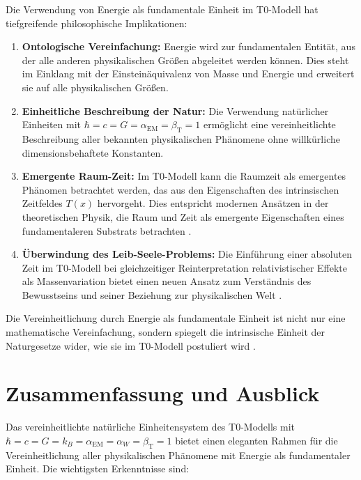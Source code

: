 \documentclass[12pt,a4paper]{article}
\newcommand{\Tfield}{T(x)}
\newcommand{\alphaEM}{\alpha_{\text{EM}}}
\newcommand{\betaT}{\beta_{\text{T}}}
\begin{document}
Die Verwendung von Energie als fundamentale Einheit im T0-Modell hat tiefgreifende philosophische Implikationen:

\begin{enumerate}
	\item \textbf{Ontologische Vereinfachung:} Energie wird zur fundamentalen Entität, aus der alle anderen physikalischen Größen abgeleitet werden können. Dies steht im Einklang mit der Einsteinäquivalenz von Masse und Energie und erweitert sie auf alle physikalischen Größen.
	
	\item \textbf{Einheitliche Beschreibung der Natur:} Die Verwendung natürlicher Einheiten mit $\hbar = c = G = \alphaEM = \betaT = 1$ ermöglicht eine vereinheitlichte Beschreibung aller bekannten physikalischen Phänomene ohne willkürliche dimensionsbehaftete Konstanten.
	
	\item \textbf{Emergente Raum-Zeit:} Im T0-Modell kann die Raumzeit als emergentes Phänomen betrachtet werden, das aus den Eigenschaften des intrinsischen Zeitfeldes $\Tfield$ hervorgeht. Dies entspricht modernen Ansätzen in der theoretischen Physik, die Raum und Zeit als emergente Eigenschaften eines fundamentaleren Substrats betrachten \cite{pascher_perspective_2025, pascher_zeit_2025}.
	
	\item \textbf{Überwindung des Leib-Seele-Problems:} Die Einführung einer absoluten Zeit im T0-Modell bei gleichzeitiger Reinterpretation relativistischer Effekte als Massenvariation bietet einen neuen Ansatz zum Verständnis des Bewusstseins und seiner Beziehung zur physikalischen Welt \cite{pascher_perspective_2025}.
\end{enumerate}

Die Vereinheitlichung durch Energie als fundamentale Einheit ist nicht nur eine mathematische Vereinfachung, sondern spiegelt die intrinsische Einheit der Naturgesetze wider, wie sie im T0-Modell postuliert wird \cite{pascher_dualismus_2025}.

\section{Zusammenfassung und Ausblick}

Das vereinheitlichte natürliche Einheitensystem des T0-Modells mit $\hbar = c = G = k_B = \alphaEM = \alpha_W = \betaT = 1$ bietet einen eleganten Rahmen für die Vereinheitlichung aller physikalischen Phänomene mit Energie als fundamentaler Einheit. Die wichtigsten Erkenntnisse sind:
\end{document}
